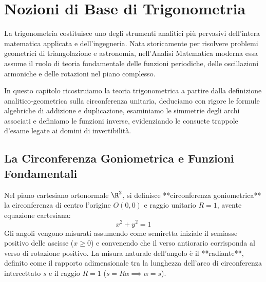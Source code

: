 \chapter{Nozioni di Base di Trigonometria}
\label{chap:trigonometria}

La trigonometria costituisce uno degli strumenti analitici più pervasivi dell'intera matematica applicata e dell'ingegneria. Nata storicamente per risolvere problemi geometrici di triangolazione e astronomia, nell'Analisi Matematica moderna essa assume il ruolo di teoria fondamentale delle funzioni periodiche, delle oscillazioni armoniche e delle rotazioni nel piano complesso.

In questo capitolo ricostruiamo la teoria trigonometrica a partire dalla definizione analitico-geometrica sulla circonferenza unitaria, deduciamo con rigore le formule algebriche di addizione e duplicazione, esaminiamo le simmetrie degli archi associati e definiamo le funzioni inverse, evidenziando le consuete trappole d'esame legate ai domini di invertibilità.

\section{La Circonferenza Goniometrica e Funzioni Fondamentali}
\label{sec:circonferenza_goniometrica_dettaglio}

Nel piano cartesiano ortonormale $\R^2$, si definisce **circonferenza goniometrica** la circonferenza di centro l'origine $O(0,0)$ e raggio unitario $R = 1$, avente equazione cartesiana:
\[
    x^2 + y^2 = 1
\]
Gli angoli vengono misurati assumendo come semiretta iniziale il semiasse positivo delle ascisse ($x \ge 0$) e convenendo che il verso antiorario corrisponda al verso di rotazione positivo. La misura naturale dell'angolo è il **radiante**, definito come il rapporto adimensionale tra la lunghezza dell'arco di circonferenza intercettato $s$ e il raggio $R = 1$ ($s = R\alpha \implies \alpha = s$).

